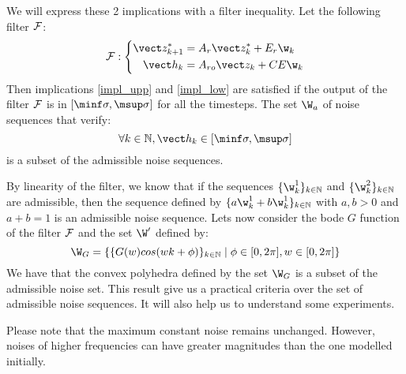 We will express these 2 implications with a filter inequality.
Let the following filter $\mathcal{F}$:
\begin{equation}
\filter:
\left\{
\begin{split}
\zkn^* &= \Ar \zk^* + \Er \wk \\
\hk &= \Aro \zk + CE \wk \\
\end{split}
\right.
\end{equation}
Then implications \ref{impl_upp} and \ref{impl_low} are satisfied if the output of the filter $\mathcal{F}$ is in $[\sinf,\ssup]$ for all the timesteps.
The set $\W_a$ of noise sequences that verify:
\begin{equation}
\forall k \in \mathbb{N}, \h_k \in [\sinf,\ssup]
\end{equation}
is a subset of the admissible noise sequences.


By linearity of the filter, we know that if the sequences $\{\wk^1\}_{k\in \mathbb{N}}$ and  $\{\wk^2\}_{k\in \mathbb{N}}$ are admissible, then the sequence defined by $\{a\wk^1 + b\wk^1\}_{k\in \mathbb{N}}$ with $a,b>0$ and $a+b = 1$ is an admissible noise sequence.
Lets now consider the bode $G$ function of the filter $\mathcal{F}$ and the set $\W'$ defined by:
$$\W_G = 
\{ 
\{G(w) cos(w k + \phi)\}_{k \in \mathbb{N}} 
\mid \phi \in [0,2\pi], w \in [0,2\pi] \}
$$
We have that the convex polyhedra defined by the set $\W_G$ is a subset of the admissible noise set.
This result give us a practical criteria over the set of admissible noise sequences.
It will also help us to understand some experiments.

Please note that the maximum constant noise remains unchanged.
However, noises of higher frequencies can have greater magnitudes than the one modelled initially. 


